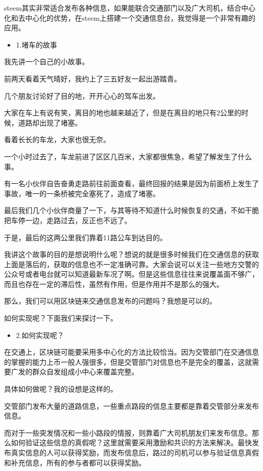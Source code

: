 \documentclass[]{ctexbook}
\providecommand{\tightlist}{%
  \setlength{\itemsep}{0pt}\setlength{\parskip}{0pt}}
\begin{document}
steem其实非常适合发布各种信息，如果能联合交通部门以及广大司机，结合中心化和去中心化的优势，在steem上搭建一个交通信息台，我觉得是一个非常有趣的应用。

\begin{itemize}
\tightlist
\item
  1.堵车的故事
\end{itemize}

我先讲一个自己的小故事。

前两天看着天气晴好，我约上了三五好友一起出游踏青。

几个朋友讨论好了目的地，开开心心的驾车出发。

大家在车上有说有笑，离目的地也越来越近了，但是在离目的地只有2公里的时候，道路却出现了堵塞。

看着长长的车龙，大家也很无奈。

一个小时过去了，车龙前进了区区几百米，大家都很焦急，希望了解发生了什么事。

有一名小伙伴自告奋勇走路前往前面查看，最终回报的结果是因为前面桥上发生了事故，唯一的一条桥被完全塞死了，造成了堵塞。

最后我们几个小伙伴商量了一下，与其等待不知道什么时候恢复的交通，不如干脆把车停一边，走路过去，反正也不远了。

于是，最后的这两公里我们靠着11路公车到达目的。

我讲这个故事的目的是想说明什么呢？想说的就是很多时候我们在交通信息的获取上面是落后的，获取的信息也不一定准确可靠。大家会说可以关注一些地方交警的公众号或者电台就可以知道最新车况了啊。但是这些信息往往来说覆盖面不够广，而且也存在一定的滞后性，虽然有作用，但是作用并不是那么的强大。

那么，我们可以用区块链来交通信息发布的问题吗？我想是可以的。

如何实现呢？下面我们来探讨一下。

\begin{itemize}
\tightlist
\item
  2.如何实现呢？
\end{itemize}

在交通上，区块链可能要采用多中心化的方法比较恰当。因为交管部门在交通信息的掌握的能力上币一般人强很多，但是交管部门对信息也不是完全的覆盖，这就需要广发的群众自发组成小中心来覆盖完整。

具体如何做呢？我的设想是这样的。

交管部门发布大量的道路信息，一些重点路段的信息主要都是靠着交管部分来发布信息。

而对于一些突发情况和一些小路段的情报，则靠着广大司机朋友们来发布信息。那么如何验证这些信息的真假呢？这里就需要采用激励和共识的方法来解决。最快发布真实信息的人可以获得奖励，而发布信息后，路过的司机可以参与验证信息真假和补充信息，所有的参与者都可以获得奖励。
\end{document}
